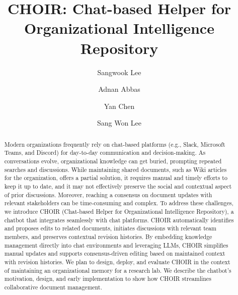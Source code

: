 \documentclass[sigconf,screen]{acmart}
\begin{document}
\title{CHOIR: Chat-based Helper for Organizational Intelligence Repository}

\author{Sangwook Lee}

\author{Adnan Abbas}

\author{Yan Chen}

\author{Sang Won Lee}

\newcommand{\system}{CHOIR}

\begin{abstract}
Modern organizations frequently rely on chat-based platforms (e.g., Slack, Microsoft Teams, and Discord) for day-to-day communication and decision-making. As conversations evolve, organizational knowledge can get buried, prompting repeated searches and discussions. While maintaining shared documents, such as Wiki articles for the organization, offers a partial solution, it requires manual and timely efforts to keep it up to date, and it may not effectively preserve the social and contextual aspect of prior discussions. Moreover, reaching a consensus on document updates with relevant stakeholders can be time-consuming and complex. To address these challenges, we introduce CHOIR (Chat-based Helper for Organizational Intelligence Repository), a chatbot that integrates seamlessly with chat platforms. CHOIR automatically identifies and proposes edits to related documents, initiates discussions with relevant team members, and preserves contextual revision histories. By embedding knowledge management directly into chat environments and leveraging LLMs, CHOIR simplifies manual updates and supports consensus-driven editing based on maintained context with revision histories. We plan to design, deploy, and evaluate CHOIR in the context of maintaining an organizational memory for a research lab. We describe the chatbot's motivation, design, and early implementation to show how CHOIR streamlines collaborative document management.
\end{abstract}
\end{document}

